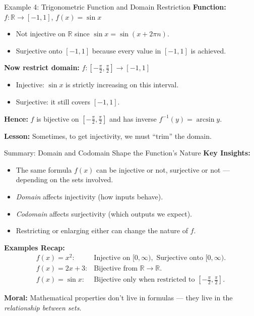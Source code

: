 \documentclass[11pt]{beamer}
\theoremstyle{plain}
\begin{document}
\begin{frame}{Example 4: Trigonometric Function and Domain Restriction}
\textbf{Function:} $f: \mathbb{R} \to [-1,1]$, $f(x) = \sin x$

\begin{itemize}
    \item Not injective on $\mathbb{R}$ since $\sin x = \sin(x + 2\pi n)$.
    \item Surjective onto $[-1,1]$ because every value in $[-1,1]$ is achieved.
\end{itemize}

\medskip
\textbf{Now restrict domain:}  
$f: \left[-\frac{\pi}{2}, \frac{\pi}{2}\right] \to [-1,1]$

\begin{itemize}
    \item Injective: $\sin x$ is strictly increasing on this interval.
    \item Surjective: it still covers $[-1,1]$.
\end{itemize}

\textbf{Hence:} $f$ is bijective on $\left[-\frac{\pi}{2}, \frac{\pi}{2}\right]$  
and has inverse $f^{-1}(y) = \arcsin y$.

\textbf{Lesson:}  
Sometimes, to get injectivity, we must “trim” the domain.
\end{frame}


\begin{frame}{Summary: Domain and Codomain Shape the Function’s Nature}
\textbf{Key Insights:}
\begin{itemize}
    \item The same formula $f(x)$ can be injective or not, surjective or not — depending on the sets involved.
    \item \emph{Domain} affects injectivity (how inputs behave).  
    \item \emph{Codomain} affects surjectivity (which outputs we expect).
    \item Restricting or enlarging either can change the nature of $f$.
\end{itemize}

\textbf{Examples Recap:}
\[
\begin{array}{lcl}
f(x) = x^2: & \text{Injective on } [0,\infty),\text{ Surjective onto } [0,\infty).\\[4pt]
f(x) = 2x+3: & \text{Bijective from } \mathbb{R}\to\mathbb{R}.\\[4pt]
f(x) = \sin x: & \text{Bijective only when restricted to } \left[-\frac{\pi}{2},\frac{\pi}{2}\right].
\end{array}
\]

\textbf{Moral:}  
Mathematical properties don’t live in formulas — they live in the \emph{relationship between sets}.
\end{frame}


\end{document}
